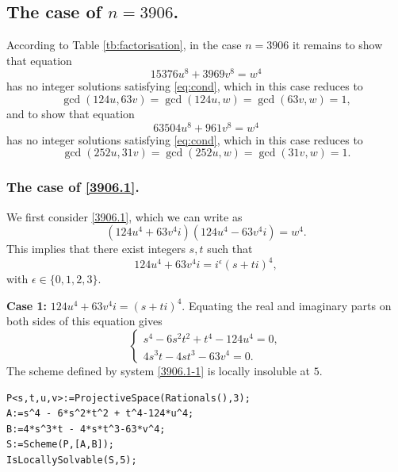 \documentclass[a4paper,12pt,english,reqno]{amsart}
\begin{document}
\subsection{The case of $n=3906$.} %
According to Table \ref{tb:factorisation}, in the case $n=3906$ it remains to
show that equation 
\begin{equation}\label{3906.1}
15376 u^8 + 3969 v^8=w^4
\end{equation}
has no integer solutions satisfying \eqref{eq:cond}, which in this case reduces to \[\gcd(124u,63v)=\gcd(124u,w)=\gcd(63v,w)=1,\]
and to show that equation 
\begin{equation}\label{3906.2}
63504 u^8 + 961 v^8=w^4
\end{equation}
has no integer solutions satisfying \eqref{eq:cond}, which in this case reduces to \[\gcd(252u,31v)=\gcd(252u,w)=\gcd(31v,w)=1.\]

\subsubsection{The case of \eqref{3906.1}.}
We first consider \eqref{3906.1}, which we can write as
\begin{equation} (124u^4+63v^4i)(124u^4-63v^4i)=w^4.
\end{equation}
This implies that there exist integers $s,t$ such that 
\[124u^4+63v^4i=i^{\epsilon}(s+ti)^4,\]
with $\epsilon \in \{0,1,2,3\}$.

{\bf Case 1:} $124u^4+63v^4i=(s+ti)^4$. Equating the real and imaginary parts on both sides of this equation gives
\begin{equation}\label{3906.1-1}
\begin{cases}
s^4 - 6s^2t^2 + t^4 - 124u^4=0,\\
4s^3t - 4st^3 - 63v^4=0.
\end{cases}
\end{equation}
The scheme defined by system \eqref{3906.1-1} is locally insoluble at $5$.


\begin{lstlisting}
P<s,t,u,v>:=ProjectiveSpace(Rationals(),3);
A:=s^4 - 6*s^2*t^2 + t^4-124*u^4;
B:=4*s^3*t - 4*s*t^3-63*v^4;
S:=Scheme(P,[A,B]);
IsLocallySolvable(S,5);
\end{lstlisting}
\end{document}
